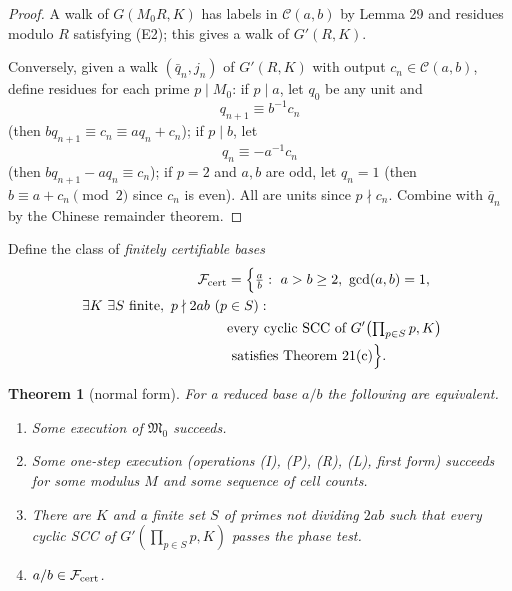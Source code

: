 \documentclass[11pt,reqno]{amsart}
\newtheorem{theorem}{Theorem}
\theoremstyle{definition}
\theoremstyle{remark}
\begin{document}
\begin{proof}\leavevmode\label{proof:36}
A walk of \(G(M_0R,K)\) has labels in \(\mathcal C(a,b)\) by
Lemma 29 and residues modulo \(R\) satisfying (E2); this gives a walk of
\(G'(R,K)\).

Conversely, given a walk \((\bar q_n,j_n)\) of \(G'(R,K)\)
with output \(c_n\in\mathcal C(a,b)\), define residues for each prime
\(p\mid M_0\): if \(p\mid a\), let \(q_0\) be any unit and
\[
q_{n+1}\equiv b^{-1}c_n
\]
(then \(bq_{n+1}\equiv c_n\equiv aq_n+c_n\));
if \(p\mid b\), let
\[
q_n\equiv-a^{-1}c_n
\]
(then \(bq_{n+1}-aq_n\equiv c_n\)); if \(p=2\) and \(a,b\) are odd, let
\(q_n=1\) (then \(b\equiv a+c_n\pmod2\) since \(c_n\) is even). All are
units since \(p\nmid c_n\). Combine with \(\bar q_n\) by the Chinese
remainder theorem. \qedhere
\end{proof}

Define the class of \emph{finitely certifiable bases}
\[
\begin{aligned}
\mathcal F_{\rm cert}&=\Bigl\{\tfrac ab:\ a>b\ge2,\ \gcd(a,b)=1,\\\
\exists K\ \exists S\text{ finite},\ p\nmid2ab\ (p&\in S):\\\
&\text{every cyclic SCC of }G'\bigl(\textstyle\prod_{p\in S}p,K\bigr)\\
&\text{ satisfies Theorem 21(c)}\Bigr\}.
\end{aligned}
\]

\begin{samepage}
\begin{theorem}[normal form]\leavevmode\label{thm:37}
For a reduced base \(a/b\) the following
are equivalent.

\begin{enumerate}
\def\labelenumi{(\arabic{enumi})}
\item
  Some execution of \(\mathfrak M_0\) succeeds.
\item
  Some one-step execution (operations (I), (P), (R), (L), first form)
  succeeds for some modulus \(M\) and some sequence of cell counts.
\item
  There are \(K\) and a finite set \(S\) of primes not dividing
  \(2ab\) such that every cyclic SCC of \(G'(\prod_{p\in S}p,K)\) passes
  the phase test.
\item
  \(a/b\in\mathcal F_{\rm cert}\).
\end{enumerate}
\label{thm-end:37}
\end{theorem}
\end{samepage}
\end{document}
